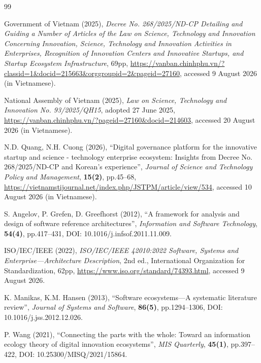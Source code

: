 \begin{thebibliography}{99}
\setlength{\itemsep}{0.35em}

Government of Vietnam (2025), \textit{Decree No. 268/2025/ND-CP Detailing and Guiding a Number of Articles of the Law on Science, Technology and Innovation Concerning Innovation, Science, Technology and Innovation Activities in Enterprises, Recognition of Innovation Centers and Innovative Startups, and Startup Ecosystem Infrastructure}, 69pp, \url{https://vanban.chinhphu.vn/?classid=1&docid=215663&orggroupid=2&pageid=27160}, accessed 9 August 2026 (in Vietnamese).

National Assembly of Vietnam (2025), \textit{Law on Science, Technology and Innovation No. 93/2025/QH15}, adopted 27 June 2025, \url{https://vanban.chinhphu.vn/?pageid=27160&docid=214603}, accessed 20 August 2026 (in Vietnamese).

N.D. Quang, N.H. Cuong (2026), ``Digital governance platform for the innovative startup and science - technology enterprise ecosystem: Insights from Decree No. 268/2025/ND-CP and Korean's experience'', \textit{Journal of Science and Technology Policy and Management}, \textbf{15(2)}, pp.45--68, \url{https://vietnamstijournal.net/index.php/JSTPM/article/view/534}, accessed 10 August 2026 (in Vietnamese).

S. Angelov, P. Grefen, D. Greefhorst (2012), ``A framework for analysis and design of software reference architectures'', \textit{Information and Software Technology}, \textbf{54(4)}, pp.417--431, DOI: 10.1016/j.infsof.2011.11.009.

ISO/IEC/IEEE (2022), \textit{ISO/IEC/IEEE 42010:2022 Software, Systems and Enterprise---Architecture Description}, 2nd ed., International Organization for Standardization, 62pp, \url{https://www.iso.org/standard/74393.html}, accessed 9 August 2026.

K. Manikas, K.M. Hansen (2013), ``Software ecosystems---A systematic literature review'', \textit{Journal of Systems and Software}, \textbf{86(5)}, pp.1294--1306, DOI: 10.1016/j.jss.2012.12.026.

P. Wang (2021), ``Connecting the parts with the whole: Toward an information ecology theory of digital innovation ecosystems'', \textit{MIS Quarterly}, \textbf{45(1)}, pp.397--422, DOI: 10.25300/MISQ/2021/15864.


\end{thebibliography}
